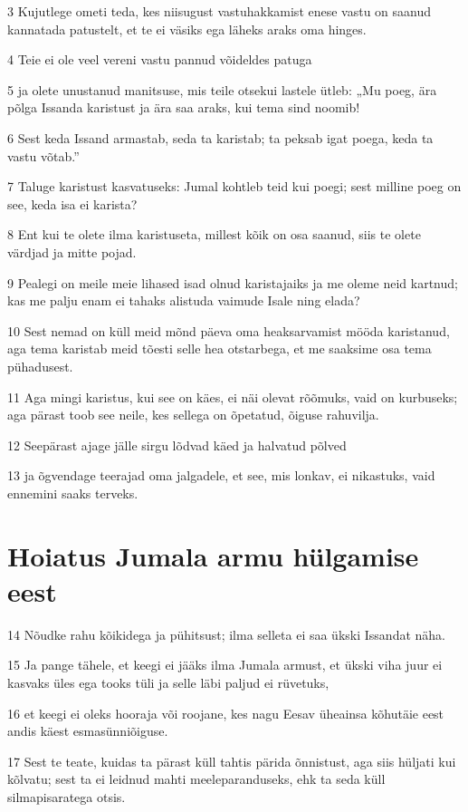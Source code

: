 \par 3 Kujutlege ometi teda, kes niisugust vastuhakkamist enese vastu on saanud kannatada patustelt, et te ei väsiks ega läheks araks oma hinges.
\par 4 Teie ei ole veel vereni vastu pannud võideldes patuga
\par 5 ja olete unustanud manitsuse, mis teile otsekui lastele ütleb: „Mu poeg, ära põlga Issanda karistust ja ära saa araks, kui tema sind noomib!
\par 6 Sest keda Issand armastab, seda ta karistab; ta peksab igat poega, keda ta vastu võtab.”
\par 7 Taluge karistust kasvatuseks: Jumal kohtleb teid kui poegi; sest milline poeg on see, keda isa ei karista?
\par 8 Ent kui te olete ilma karistuseta, millest kõik on osa saanud, siis te olete värdjad ja mitte pojad.
\par 9 Pealegi on meile meie lihased isad olnud karistajaiks ja me oleme neid kartnud; kas me palju enam ei tahaks alistuda vaimude Isale ning elada?
\par 10 Sest nemad on küll meid mõnd päeva oma heaksarvamist mööda karistanud, aga tema karistab meid tõesti selle hea otstarbega, et me saaksime osa tema pühadusest.
\par 11 Aga mingi karistus, kui see on käes, ei näi olevat rõõmuks, vaid on kurbuseks; aga pärast toob see neile, kes sellega on õpetatud, õiguse rahuvilja.
\par 12 Seepärast ajage jälle sirgu lõdvad käed ja halvatud põlved
\par 13 ja õgvendage teerajad oma jalgadele, et see, mis lonkav, ei nikastuks, vaid ennemini saaks terveks.

\section*{Hoiatus Jumala armu hülgamise eest}

\par 14 Nõudke rahu kõikidega ja pühitsust; ilma selleta ei saa ükski Issandat näha.
\par 15 Ja pange tähele, et keegi ei jääks ilma Jumala armust, et ükski viha juur ei kasvaks üles ega tooks tüli ja selle läbi paljud ei rüvetuks,
\par 16 et keegi ei oleks hooraja või roojane, kes nagu Eesav üheainsa kõhutäie eest andis käest esmasünniõiguse.
\par 17 Sest te teate, kuidas ta pärast küll tahtis pärida õnnistust, aga siis hüljati kui kõlvatu; sest ta ei leidnud mahti meeleparanduseks, ehk ta seda küll silmapisaratega otsis.

